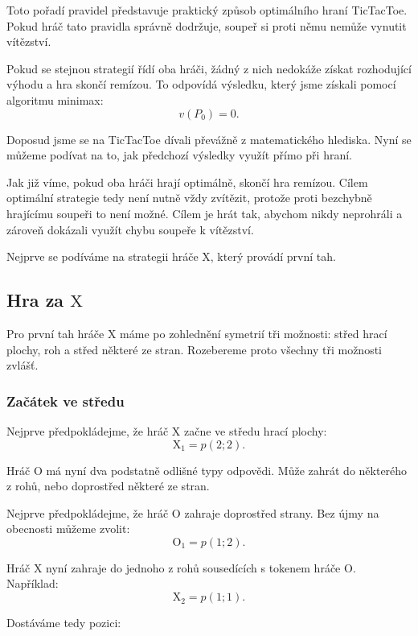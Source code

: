 \documentclass[12pt,a4paper]{article}
\begin{document}
Toto pořadí pravidel představuje praktický způsob optimálního hraní TicTacToe. 
Pokud hráč tato pravidla správně dodržuje, soupeř si proti němu nemůže vynutit vítězství.

Pokud se stejnou strategií řídí oba hráči, 
žádný z nich nedokáže získat rozhodující výhodu a hra skončí remízou. 
To odpovídá výsledku, který jsme získali pomocí algoritmu minimax:
\[
    v(P_0)=0.
\]

Doposud jsme se na TicTacToe dívali převážně z matematického hlediska.
Nyní se můžeme podívat na to, jak předchozí výsledky využít přímo při hraní.

Jak již víme, pokud oba hráči hrají optimálně, skončí hra remízou.
Cílem optimální strategie tedy není nutně vždy zvítězit, 
protože proti bezchybně hrajícímu soupeři to není možné.
Cílem je hrát tak, abychom nikdy neprohráli 
a zároveň dokázali využít chybu soupeře k vítězství.

Nejprve se podíváme na strategii hráče $\mathrm{X}$, který provádí první tah.

\subsection*{Hra za $\mathrm{X}$}

Pro první tah hráče $\mathrm{X}$ máme po zohlednění symetrií tři možnosti:
střed hrací plochy, roh a střed některé ze stran.
Rozebereme proto všechny tři možnosti zvlášť.

\subsubsection*{Začátek ve středu}

Nejprve předpokládejme, že hráč $\mathrm{X}$ začne ve středu hrací plochy:
\[
    \mathrm{X}_1=p(2;2).
\]

Hráč $\mathrm{O}$ má nyní dva podstatně odlišné typy odpovědi.
Může zahrát do některého z rohů, nebo doprostřed některé ze stran.

Nejprve předpokládejme, že hráč $\mathrm{O}$ zahraje doprostřed strany.
Bez újmy na obecnosti můžeme zvolit:
\[
    \mathrm{O}_1=p(1;2).
\]

Hráč $\mathrm{X}$ nyní zahraje do jednoho z rohů sousedících s tokenem hráče $\mathrm{O}$.
Například:
\[
    \mathrm{X}_2=p(1;1).
\]

Dostáváme tedy pozici:
\end{document}
